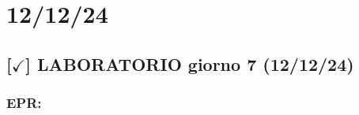 \section{12/12/24}

\subsection{[$\checkmark$] LABORATORIO giorno 7 (12/12/24)}

\subsubsection{EPR: }